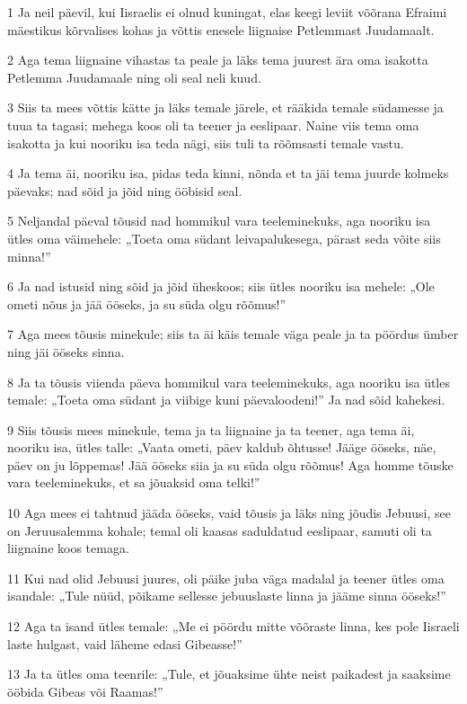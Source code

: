 \par 1 Ja neil päevil, kui Iisraelis ei olnud kuningat, elas keegi leviit võõrana Efraimi mäestikus kõrvalises kohas ja võttis enesele liignaise Petlemmast Juudamaalt.
\par 2 Aga tema liignaine vihastas ta peale ja läks tema juurest ära oma isakotta Petlemma Juudamaale ning oli seal neli kuud.
\par 3 Siis ta mees võttis kätte ja läks temale järele, et rääkida temale südamesse ja tuua ta tagasi; mehega koos oli ta teener ja eeslipaar. Naine viis tema oma isakotta ja kui nooriku isa teda nägi, siis tuli ta rõõmsasti temale vastu.
\par 4 Ja tema äi, nooriku isa, pidas teda kinni, nõnda et ta jäi tema juurde kolmeks päevaks; nad sõid ja jõid ning ööbisid seal.
\par 5 Neljandal päeval tõusid nad hommikul vara teeleminekuks, aga nooriku isa ütles oma väimehele: „Toeta oma südant leivapalukesega, pärast seda võite siis minna!”
\par 6 Ja nad istusid ning sõid ja jõid üheskoos; siis ütles nooriku isa mehele: „Ole ometi nõus ja jää ööseks, ja su süda olgu rõõmus!”
\par 7 Aga mees tõusis minekule; siis ta äi käis temale väga peale ja ta pöördus ümber ning jäi ööseks sinna.
\par 8 Ja ta tõusis viienda päeva hommikul vara teeleminekuks, aga nooriku isa ütles temale: „Toeta oma südant ja viibige kuni päevaloodeni!” Ja nad sõid kahekesi.
\par 9 Siis tõusis mees minekule, tema ja ta liignaine ja ta teener, aga tema äi, nooriku isa, ütles talle: „Vaata ometi, päev kaldub õhtusse! Jääge ööseks, näe, päev on ju lõppemas! Jää ööseks siia ja su süda olgu rõõmus! Aga homme tõuske vara teeleminekuks, et sa jõuaksid oma telki!”
\par 10 Aga mees ei tahtnud jääda ööseks, vaid tõusis ja läks ning jõudis Jebuusi, see on Jeruusalemma kohale; temal oli kaasas saduldatud eeslipaar, samuti oli ta liignaine koos temaga.
\par 11 Kui nad olid Jebuusi juures, oli päike juba väga madalal ja teener ütles oma isandale: „Tule nüüd, põikame sellesse jebuuslaste linna ja jääme sinna ööseks!”
\par 12 Aga ta isand ütles temale: „Me ei pöördu mitte võõraste linna, kes pole Iisraeli laste hulgast, vaid läheme edasi Gibeasse!”
\par 13 Ja ta ütles oma teenrile: „Tule, et jõuaksime ühte neist paikadest ja saaksime ööbida Gibeas või Raamas!”
